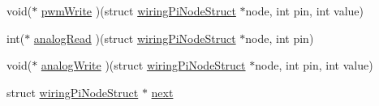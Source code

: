 \begin{DoxyCompactItemize}
\item 
void($\ast$ \hyperlink{structwiringPiNodeStruct_af8e3c325938bb0d691a9751b4c410d8c}{pwm\-Write} )(struct \hyperlink{structwiringPiNodeStruct}{wiring\-Pi\-Node\-Struct} $\ast$node, int pin, int value)
\item 
int($\ast$ \hyperlink{structwiringPiNodeStruct_a9755fcb91cbac43810cf1fa1efd41f95}{analog\-Read} )(struct \hyperlink{structwiringPiNodeStruct}{wiring\-Pi\-Node\-Struct} $\ast$node, int pin)
\item 
void($\ast$ \hyperlink{structwiringPiNodeStruct_a4c62d270ac83831a01974c15db0df2e4}{analog\-Write} )(struct \hyperlink{structwiringPiNodeStruct}{wiring\-Pi\-Node\-Struct} $\ast$node, int pin, int value)
\item 
struct \hyperlink{structwiringPiNodeStruct}{wiring\-Pi\-Node\-Struct} $\ast$ \hyperlink{structwiringPiNodeStruct_aea1a1994ed51b0dca743cc5a5a796adf}{next}
\end{DoxyCompactItemize}


